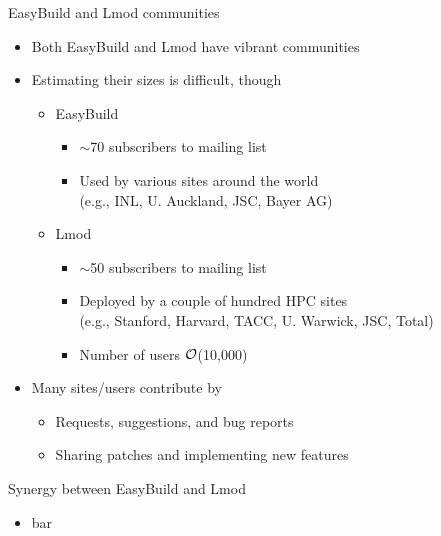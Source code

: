 \documentclass[10pt,xcolor={usenames,dvipsnames}]{beamer}
\begin{document}
\begin{frame}{EasyBuild and Lmod communities}
\begin{itemize}
    \item
        Both EasyBuild and Lmod have vibrant communities
    \item
        Estimating their sizes is difficult, though
        \begin{itemize}
            \item
                EasyBuild
                \begin{itemize}
                    \item
                        $\sim$70 subscribers to mailing list
                    \item
                        Used by various sites around the world\\
                        (e.g., INL, U. Auckland, JSC, Bayer AG)
                \end{itemize}
            \item
                Lmod
                \begin{itemize}
                    \item
                        $\sim$50 subscribers to mailing list
                    \item
                        Deployed by a couple of hundred HPC sites\\
                        (e.g., Stanford, Harvard, TACC, U. Warwick, JSC, Total)
                    \item
                        Number of users $\cal{O}$(10,000)
                \end{itemize}
        \end{itemize}
    \item
        Many sites/users contribute by
        \begin{itemize}
            \item
                Requests, suggestions, and bug reports
            \item
                Sharing patches and implementing new features
        \end{itemize}
\end{itemize}
\end{frame}


\begin{frame}{Synergy between EasyBuild and Lmod}
\begin{itemize}
    \item bar
\end{itemize}
\end{frame}
\end{document}
